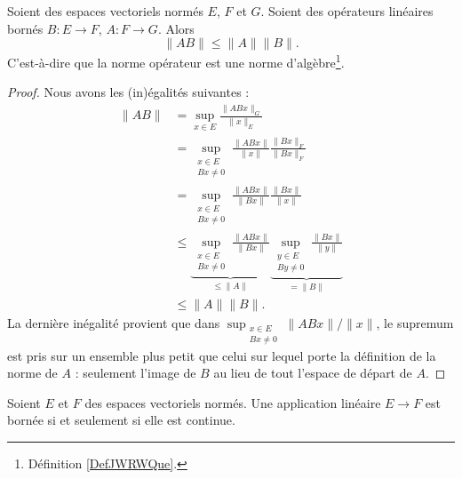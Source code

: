 \begin{lemma}   \label{LEMooFITMooBBBWGI}
    Soient des espaces vectoriels normés \( E\), \( F\) et \( G\). Soient des opérateurs linéaires bornés \( B\colon E\to F\), \( A\colon F\to G\). Alors
    \begin{equation}
        \| AB \|\leq \| A \|\| B \|.
    \end{equation}
    C'est-à-dire que la norme opérateur est une norme d'algèbre\footnote{Définition \ref{DefJWRWQue}.}.
\end{lemma}

\begin{proof}

    Nous avons les (in)égalités suivantes :
    \begin{subequations}
        \begin{align}
            \| AB \|&=\sup_{x\in E}\frac{ \| ABx \|_G }{ \| x \|_E }\\
            &=\sup_{\substack{x\in E\\Bx\neq 0}}\frac{ \| ABx \| }{ \| x \| }\frac{ \| Bx \|_F }{ \| Bx \|_F }\\
            &=\sup_{\substack{x\in E\\Bx\neq 0}}\frac{ \| ABx \| }{ \| Bx \| }\frac{ \| Bx \| }{ \| x \| }\\
            &\leq\underbrace{\sup_{\substack{x\in E\\Bx\neq 0}}\frac{ \| ABx \| }{ \| Bx \| }}_{\leq\| A \|}\underbrace{\sup_{\substack{y\in E\\By\neq 0}}\frac{ \| Bx \| }{ \| y \| }}_{=\| B \|}\\
            &\leq \| A \|\| B \|.
        \end{align}
    \end{subequations}
    La dernière inégalité provient que dans \( \sup_{\substack{x\in E\\Bx\neq 0}}\| ABx \|/\| x \|\), le supremum est pris sur un ensemble plus petit que celui sur lequel porte la définition de la norme de \( A\) : seulement l'image de \( B\) au lieu de tout l'espace de départ de \( A\).
\end{proof}

\begin{proposition}       \label{PROPooQZYVooYJVlBd}
    Soient \( E\) et \( F\) des espaces vectoriels normés. Une application linéaire \( E\to F\) est bornée si et seulement si elle est continue.
\end{proposition}

